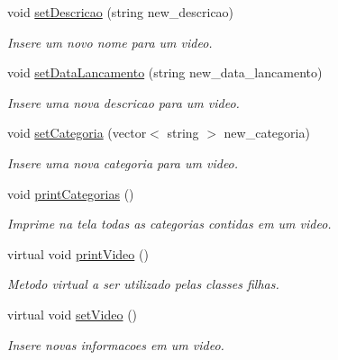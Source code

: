 \begin{DoxyCompactItemize}
void \hyperlink{classVideo_a133d51a6d192c248c1013bdd81508bcb}{set\+Descricao} (string new\+\_\+descricao)
\begin{DoxyCompactList}\small\item\em Insere um novo nome para um video. \end{DoxyCompactList}\item 
void \hyperlink{classVideo_aad4e9417ebbb6c8418a3a3769f4ff7a8}{set\+Data\+Lancamento} (string new\+\_\+data\+\_\+lancamento)
\begin{DoxyCompactList}\small\item\em Insere uma nova descricao para um video. \end{DoxyCompactList}\item 
void \hyperlink{classVideo_acfd3e3947d7ffabef36eb18cf4049a48}{set\+Categoria} (vector$<$ string $>$ new\+\_\+categoria)
\begin{DoxyCompactList}\small\item\em Insere uma nova categoria para um video. \end{DoxyCompactList}\item 
void \hyperlink{classVideo_ad95dd3840a6818ecd144b882b4fd0902}{print\+Categorias} ()\hypertarget{classVideo_ad95dd3840a6818ecd144b882b4fd0902}{}\label{classVideo_ad95dd3840a6818ecd144b882b4fd0902}

\begin{DoxyCompactList}\small\item\em Imprime na tela todas as categorias contidas em um video. \end{DoxyCompactList}\item 
virtual void \hyperlink{classVideo_affd6d79b2807e62a9ed3cf343541edd0}{print\+Video} ()\hypertarget{classVideo_affd6d79b2807e62a9ed3cf343541edd0}{}\label{classVideo_affd6d79b2807e62a9ed3cf343541edd0}

\begin{DoxyCompactList}\small\item\em Metodo virtual a ser utilizado pelas classes filhas. \end{DoxyCompactList}\item 
virtual void \hyperlink{classVideo_ab3be5dacd179c1bf7e410e27de32c3f1}{set\+Video} ()\hypertarget{classVideo_ab3be5dacd179c1bf7e410e27de32c3f1}{}\label{classVideo_ab3be5dacd179c1bf7e410e27de32c3f1}

\begin{DoxyCompactList}\small\item\em Insere novas informacoes em um video. \end{DoxyCompactList}\end{DoxyCompactItemize}
